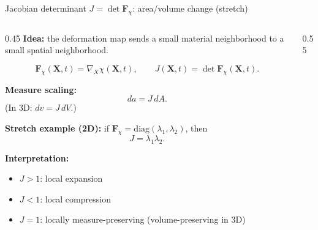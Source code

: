\documentclass[aspectratio=169]{beamer}
\newcommand{\X}{\bm{X}}
\newcommand{\gradX}{\nabla_{\!X}}
\newcommand{\Fdef}{\bm{F}_{\chi}}  %
\begin{document}
\begin{frame}{Jacobian determinant $J=\det\Fdef$: area/volume change (stretch)}
\footnotesize
\begin{columns}[T,onlytextwidth]
  \begin{column}{0.45\textwidth}
  \textbf{Idea:} the deformation map sends a small material neighborhood to a small spatial neighborhood.

  \[
  \Fdef(\X,t)=\gradX\chi(\X,t), \qquad
  J(\X,t)=\det\Fdef(\X,t).
  \]

  \textbf{Measure scaling:}
  \[
  da = J\, dA.
  \]
  \scriptsize (In 3D: $dv = J\, dV$.)

  \textbf{Stretch example (2D):} if \(\Fdef=\mathrm{diag}(\lambda_1,\lambda_2)\), then
  \[
  J=\lambda_1\lambda_2.
  \]

  \textbf{Interpretation:}
  \begin{itemize}
    \item \(J>1\): local expansion
    \item \(J<1\): local compression
    \item \(J=1\): locally measure-preserving (volume-preserving in 3D)
  \end{itemize}
  \end{column}

  \begin{column}{0.55\textwidth}
  \centering
\medskip
\medskip
\medskip
\medskip
\medskip
\medskip

  \end{column}
\end{columns}
\end{frame}
\end{document}

